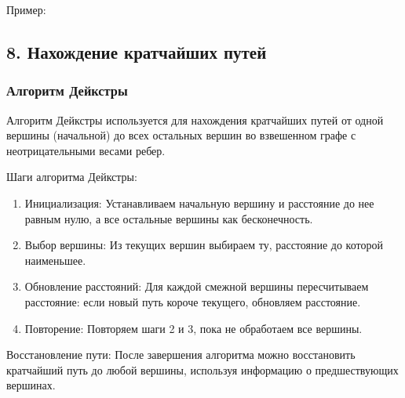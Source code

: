 \documentclass{article}
\begin{document}
Пример:

\pagebreak
 
\subsection*{8. Нахождение кратчайших путей}

\subsubsection*{Алгоритм Дейкстры}
Алгоритм Дейкстры используется для нахождения кратчайших путей от одной вершины (начальной) до всех остальных вершин во взвешенном графе с неотрицательными весами ребер.

Шаги алгоритма Дейкстры:
\begin{enumerate}
\item  Инициализация: Устанавливаем начальную вершину и расстояние до нее равным нулю, а все остальные вершины как бесконечность.

\item  Выбор вершины: Из текущих вершин выбираем ту, расстояние до которой наименьшее.

\item  Обновление расстояний: Для каждой смежной вершины пересчитываем расстояние: если новый путь короче текущего, обновляем расстояние.

\item  Повторение: Повторяем шаги 2 и 3, пока не обработаем все вершины.
\end{enumerate}

Восстановление пути: После завершения алгоритма можно восстановить кратчайший путь до любой вершины, используя информацию о предшествующих вершинах.
\end{document}
